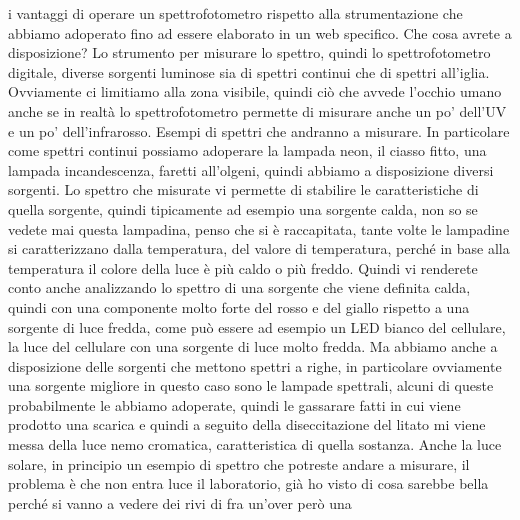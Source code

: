 i vantaggi di operare un spettrofotometro rispetto alla strumentazione che abbiamo adoperato fino ad essere elaborato in un web specifico. Che cosa avrete a disposizione? Lo strumento per misurare lo spettro, quindi lo spettrofotometro digitale, diverse sorgenti luminose sia di spettri continui che di spettri all'iglia. Ovviamente ci limitiamo alla zona visibile, quindi ciò che avvede l'occhio umano anche se in realtà lo spettrofotometro permette di misurare anche un po' dell'UV e un po' dell'infrarosso. Esempi di spettri che andranno a misurare. In particolare come spettri continui possiamo adoperare la lampada neon, il ciasso fitto, una lampada incandescenza, faretti all'olgeni, quindi abbiamo a disposizione diversi sorgenti. Lo spettro che misurate vi permette di stabilire le caratteristiche di quella sorgente, quindi tipicamente ad esempio una sorgente calda, non so se vedete mai questa lampadina, penso che si è raccapitata, tante volte le lampadine si caratterizzano dalla temperatura, del valore di temperatura, perché in base alla temperatura il colore della luce è più caldo o più freddo. Quindi vi renderete conto anche analizzando lo spettro di una sorgente che viene definita calda, quindi con una componente molto forte del rosso e del giallo rispetto a una sorgente di luce fredda, come può essere ad esempio un LED bianco del cellulare, la luce del cellulare con una sorgente di luce molto fredda. Ma abbiamo anche a disposizione delle sorgenti che mettono spettri a righe, in particolare ovviamente una sorgente migliore in questo caso sono le lampade spettrali, alcuni di queste probabilmente le abbiamo adoperate, quindi le gassarare fatti in cui viene prodotto una scarica e quindi a seguito della diseccitazione del litato mi viene messa della luce nemo cromatica, caratteristica di quella sostanza. Anche la luce solare, in principio un esempio di spettro che potreste andare a misurare, il problema è che non entra luce il laboratorio, già ho visto di cosa sarebbe bella perché si vanno a vedere dei rivi di fra un'over però una

